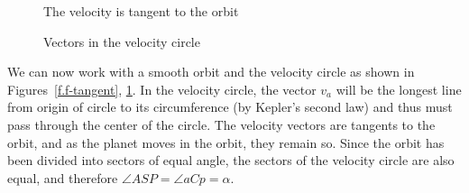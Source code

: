
\begin{figure}[b]
\begin{minipage}{.5\textwidth}
\begin{center}
\caption{The velocity is tangent to the orbit}\label{f.f-tangent}
\end{center}
\end{minipage}
\begin{minipage}{.5\textwidth}
\begin{center}
\caption{Vectors in the velocity circle}\label{f.f-vector-velocity}
\end{center}
\end{minipage}
\end{figure}


We can now work with a smooth orbit and the velocity circle as shown in  Figures~\ref{f.f-tangent}, \ref{f.f-vector-velocity}. In the velocity circle, the vector $v_a$ will be the longest line from origin of circle to its circumference (by Kepler's second law) and thus must pass through the center of the circle. The velocity vectors are tangents to the orbit, and as the planet moves in the orbit, they remain so. Since the orbit has been divided into sectors of equal angle, the sectors of the velocity circle are also equal, and therefore $\angle ASP = \angle aCp=\alpha$.

